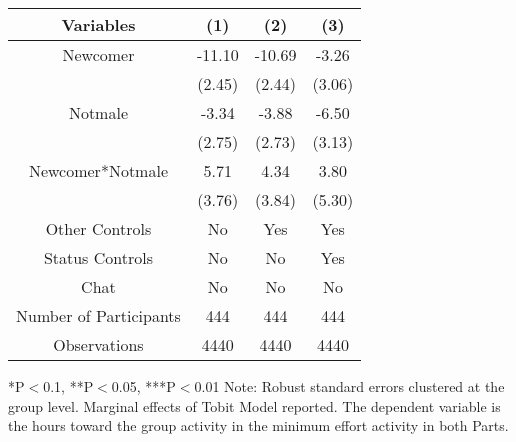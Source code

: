 \begin{table}[htbp]
    \begin{tabular}{c c c c}
    \toprule
    \textbf{Variables} & \textbf{(1)} & \textbf{(2)} & \textbf{(3)}       \\ 
\midrule
Newcomer                         &     -11.10\sym{***} &     -10.69\sym{***}  &  -3.26   \\
                                 &     (2.45)          &     (2.44)          &  (3.06)             \\
Notmale                         &    -3.34            &     -3.88   &  -6.50     \\
                                 &     (2.75)          &     (2.73)          &  (3.13)             \\
Newcomer*Notmale               &     5.71            &  4.34               &  3.80    \\
                                 &     (3.76)          &   (3.84)          &  (5.30)             \\


\midrule
Other Controls                   &    No               &    Yes              &    Yes            \\
Status Controls                    &    No               &    No               &    Yes           \\
Chat                             &    No               &    No               &    No             \\
\midrule
Number of Participants           &    444               &    444              &    444               \\
\midrule
Observations                     &       4440          &       4440          &  4440            \\
\bottomrule

\end{tabular}
\begin{footnotesize}
\newline
*P$<$0.1, **P$<$0.05, ***P$<$0.01
\newline
Note: Robust standard errors clustered at the group level. Marginal effects of Tobit Model reported. 
\newline
The dependent variable is the hours toward the group activity in the minimum effort activity in both Parts. \end{footnotesize}
\end{table}
